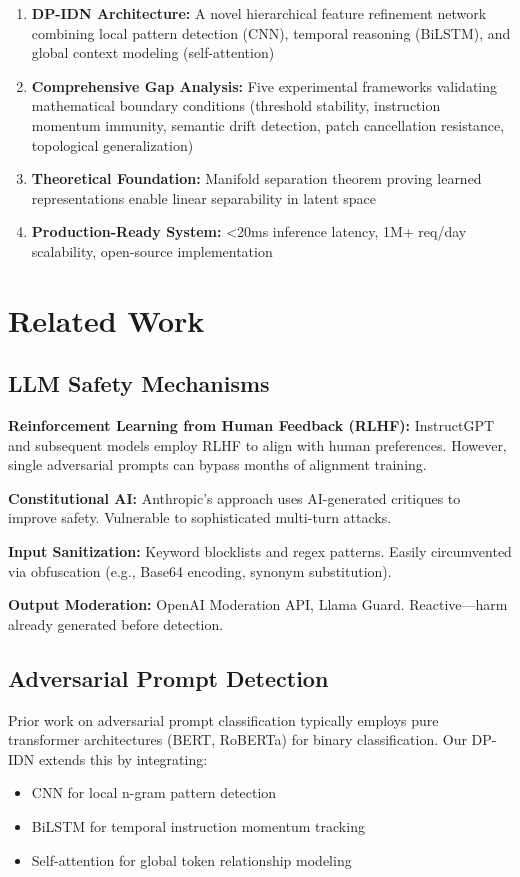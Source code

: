 \documentclass[11pt,twocolumn]{article}
\begin{document}
\begin{enumerate}[noitemsep]
    \item \textbf{DP-IDN Architecture:} A novel hierarchical feature refinement network combining local pattern detection (CNN), temporal reasoning (BiLSTM), and global context modeling (self-attention)
    \item \textbf{Comprehensive Gap Analysis:} Five experimental frameworks validating mathematical boundary conditions (threshold stability, instruction momentum immunity, semantic drift detection, patch cancellation resistance, topological generalization)
    \item \textbf{Theoretical Foundation:} Manifold separation theorem proving learned representations enable linear separability in latent space
    \item \textbf{Production-Ready System:} <20ms inference latency, 1M+ req/day scalability, open-source implementation
\end{enumerate}

\section{Related Work}

\subsection{LLM Safety Mechanisms}

\textbf{Reinforcement Learning from Human Feedback (RLHF):} InstructGPT and subsequent models employ RLHF to align with human preferences. However, single adversarial prompts can bypass months of alignment training.

\textbf{Constitutional AI:} Anthropic's approach uses AI-generated critiques to improve safety. Vulnerable to sophisticated multi-turn attacks.

\textbf{Input Sanitization:} Keyword blocklists and regex patterns. Easily circumvented via obfuscation (e.g., Base64 encoding, synonym substitution).

\textbf{Output Moderation:} OpenAI Moderation API, Llama Guard. Reactive—harm already generated before detection.

\subsection{Adversarial Prompt Detection}

Prior work on adversarial prompt classification typically employs pure transformer architectures (BERT, RoBERTa) for binary classification. Our DP-IDN extends this by integrating:
\begin{itemize}[noitemsep]
    \item CNN for local n-gram pattern detection
    \item BiLSTM for temporal instruction momentum tracking
    \item Self-attention for global token relationship modeling
\end{itemize}
\end{document}
